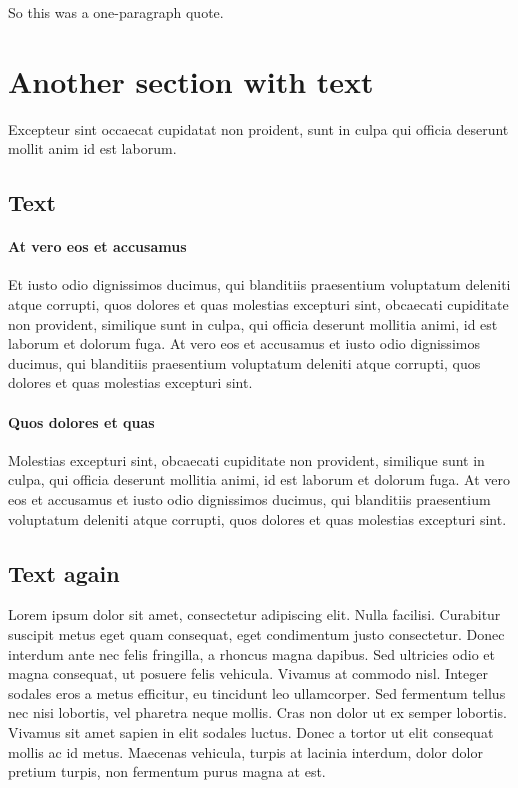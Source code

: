 So this was a one-paragraph quote.

\section{Another section with text}\label{s:ccl}

Excepteur sint occaecat cupidatat non proident, sunt in culpa qui officia deserunt mollit anim id est laborum.

\subsection{Text}\label{s:text}


\paragraph{At vero eos et accusamus} Et iusto odio dignissimos ducimus, qui blanditiis praesentium voluptatum deleniti atque corrupti, quos dolores et quas molestias excepturi sint, obcaecati cupiditate non provident, similique sunt in culpa, qui officia deserunt mollitia animi, id est laborum et dolorum fuga. At vero eos et accusamus et iusto odio dignissimos ducimus, qui blanditiis praesentium voluptatum deleniti atque corrupti, quos dolores et quas molestias excepturi sint.

\paragraph{Quos dolores et quas} Molestias excepturi sint, obcaecati cupiditate non provident, similique sunt in culpa, qui officia deserunt mollitia animi, id est laborum et dolorum fuga. At vero eos et accusamus et iusto odio dignissimos ducimus, qui blanditiis praesentium voluptatum deleniti atque corrupti, quos dolores et quas molestias excepturi sint.

\subsection{Text again}

Lorem ipsum dolor sit amet, consectetur adipiscing elit. Nulla facilisi. Curabitur suscipit metus eget quam consequat, eget condimentum justo consectetur. Donec interdum ante nec felis fringilla, a rhoncus magna dapibus. Sed ultricies odio et magna consequat, ut posuere felis vehicula. Vivamus at commodo nisl. Integer sodales eros a metus efficitur, eu tincidunt leo ullamcorper. Sed fermentum tellus nec nisi lobortis, vel pharetra neque mollis. Cras non dolor ut ex semper lobortis. Vivamus sit amet sapien in elit sodales luctus. Donec a tortor ut elit consequat mollis ac id metus. Maecenas vehicula, turpis at lacinia interdum, dolor dolor pretium turpis, non fermentum purus magna at est. 

